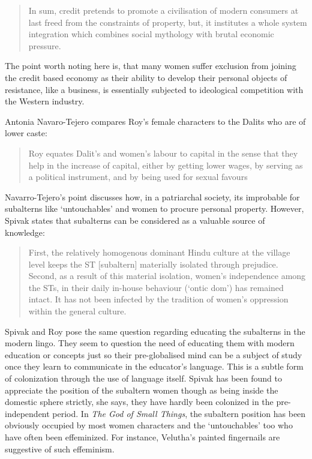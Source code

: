 \begin{quote}
  In sum, credit pretends to promote a civilisation of modern consumers at last freed from the constraints of property, but, it institutes a whole system integration which combines social mythology with brutal economic pressure. \parencite[162]{Baudrillard1996}
\end{quote}

The point worth noting here is, that many women suffer exclusion from joining the credit based economy as their ability to develop their personal objects of resistance, like a business, is essentially subjected to ideological competition with the Western industry. 

Antonia Navaro-Tejero compares Roy's female characters to the Dalits who are of lower caste:

\begin{quote}
  Roy equates Dalit's and women's labour to capital in the sense that they help in the increase of capital, either by getting lower wages, by serving as a political instrument, and by being used for sexual favours \parencite[104]{Navarro2006}
\end{quote}

Navarro-Tejero's point discusses how, in a patriarchal society, its improbable for subalterns like `untouchables' and women to procure personal property. However, Spivak states that subalterns can be considered as a valuable source of knowledge: 

\begin{quote}
  First, the relatively homogenous dominant Hindu culture at the village level keeps the ST [subaltern] materially isolated through prejudice. Second, as a result of this material isolation, women's independence among the STs, in their daily in-house behaviour (`ontic dom') has remained intact. It has not been infected by the tradition of women's oppression within the general culture. \parencite[335]{Spivak2008}
\end{quote}

Spivak and Roy pose the same question regarding educating the subalterns in the modern lingo. They seem to question the need of educating them with modern education or concepts just so their pre-globalised mind can be a subject of study once they learn to communicate in the educator's language. This is a subtle form of colonization through the use of language itself. Spivak has been found to appreciate the position of the subaltern women though as being inside the domestic sphere strictly, she says, they have hardly been colonized in the pre-independent period. In \emph{The God of Small Things}, the subaltern position has been obviously occupied by most women characters and the `untouchables' too who have often been effeminized. For instance, Velutha's painted fingernails are suggestive of such effeminism. 

